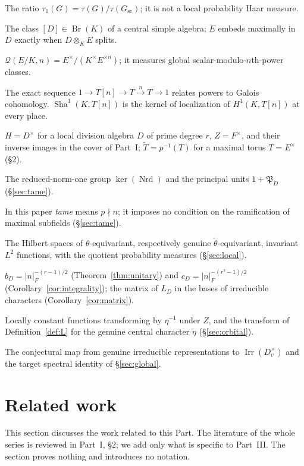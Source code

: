 \documentclass[11pt]{article}
\newcommand{\Nrd}{\operatorname{Nrd}}
\newcommand{\Irr}{\operatorname{Irr}}
\newcommand{\tH}{\widetilde H}
\newcommand{\tZ}{\widetilde Z}
\newcommand{\Sha}{\operatorname{Sha}}
\theoremstyle{plain}
\theoremstyle{definition}
\begin{document}
\begin{description}[style=nextline,leftmargin=2.7cm,labelwidth=2.5cm,font=\normalfont\bfseries]
The ratio $\tau_1(G)=\tau(G)/\tau(G_{\mathrm{sc}})$; it is not
a local probability Haar measure.
\item[Brauer class]
The class $[D]\in\operatorname{Br}(K)$ of a central simple algebra;
$E$ embeds maximally in $D$ exactly when $D\otimes_K E$ splits.
\item[Scalar power quotient]
$\mathcal Q(E/K,n)=E^\times/(K^\times E^{\times n})$;
it measures global scalar-modulo-$n$th-power classes.
\item[Kummer and $\Sha^1$]
The exact sequence $1\to T[n]\to T\xrightarrow{n}T\to1$
relates powers to Galois cohomology. $\Sha^1(K,T[n])$ is the
kernel of localization of $H^1(K,T[n])$ at every place.
\item[$H$, $Z$, $\tH$, $\tZ$, $\widetilde T$]
$H=D^\times$ for a local division algebra $D$ of prime degree $r$, $Z=F^\times$, and their inverse images in the cover of Part~I; $\widetilde T=p^{-1}(T)$ for a maximal torus $T=E^\times$ (\S2).
\item[$H^1$, $U_D^1$]
The reduced-norm-one group $\ker(\Nrd)$ and the principal units $1+\mathfrak P_D$ (\S\ref{sec:tame}).
\item[Tame, wild]
In this paper \emph{tame} means $p\nmid n$; it imposes no condition on the ramification of maximal subfields (\S\ref{sec:tame}).
\item[$\mathcal H_\theta(H)$, $\mathcal H_{\widetilde\theta}(\tH)$]
The Hilbert spaces of $\theta$-equivariant, respectively genuine $\tilde\theta$-equivariant, invariant $L^2$ functions, with the quotient probability measures (\S\ref{sec:local}).
\item[$b_D$, $c_D$; character matrix]
$b_D=|n|_F^{-(r-1)/2}$ (Theorem~\ref{thm:unitary}) and $c_D=|n|_F^{-(r^2-1)/2}$ (Corollary~\ref{cor:integrality}); the matrix of $L_D$ in the bases of irreducible characters (Corollary~\ref{cor:matrix}).
\item[$\mathcal C_{\eta^{-1}}(H)$, $L_D^{(\widetilde\eta)}$]
Locally constant functions transforming by $\eta^{-1}$ under $Z$, and the transform of Definition~\ref{def:L} for the genuine central character $\widetilde\eta$ (\S\ref{sec:orbital}).
\item[$\Psi_D$, (\ref{eq:global-conj})]
The conjectural map from genuine irreducible representations to $\Irr(D_v^\times)$ and the target spectral identity of \S\ref{sec:global}.
\end{description}

\section{Related work}\label{sec:related}
This section discusses the work related to this Part. The literature of the whole series is reviewed in Part~I, \S2; we add only what is specific to Part~III. The section proves nothing and introduces no notation.
\end{document}
